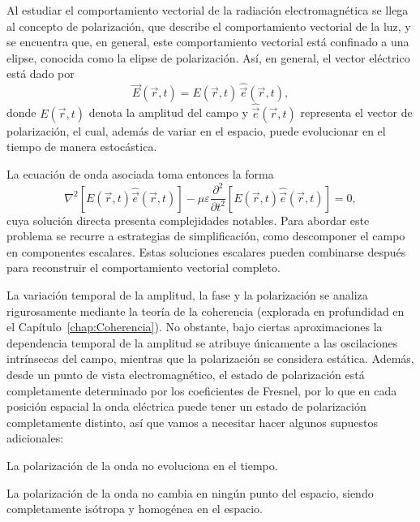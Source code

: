 	Al estudiar el comportamiento vectorial de la radiación electromagnética se llega al concepto de polarización, que describe el comportamiento vectorial de la luz, y se encuentra que, en general, este comportamiento vectorial está confinado a una elipse, conocida como la elipse de polarización. Así, en general, el vector eléctrico está dado por
	\begin{equation}
	\vec{E}(\vec{r},t) = E(\vec{r},t) \, \hat{\vec{e}}(\vec{r},t),
	\end{equation}
	donde $E(\vec{r},t)$ denota la amplitud del campo y $\hat{\vec{e}}(\vec{r},t)$ representa el vector de polarización, el cual, además de variar en el espacio, puede evolucionar en el tiempo de manera estocástica.

	La ecuación de onda asociada toma entonces la forma
	\begin{equation}
	\nabla^2 \left[ E(\vec{r},t)\hat{\vec{e}}(\vec{r},t) \right] - \mu\varepsilon \frac{\partial^2}{\partial t^2} \left[ E(\vec{r},t)\hat{\vec{e}}(\vec{r},t) \right] = 0,
	\end{equation}
	cuya solución directa presenta complejidades notables. Para abordar este problema se recurre a estrategias de simplificación, como descomponer el campo en componentes escalares. Estas soluciones escalares pueden combinarse después para reconstruir el comportamiento vectorial completo.

	La variación temporal de la amplitud, la fase y la polarización se analiza rigurosamente mediante la teoría de la coherencia (explorada en profundidad en el Capítulo~\ref{chap:Coherencia}). No obstante, bajo ciertas aproximaciones la dependencia temporal de la amplitud se atribuye únicamente a las oscilaciones intrínsecas del campo, mientras que la polarización se considera estática. Además, desde un punto de vista electromagnético, el estado de polarización está completamente determinado por los coeficientes de Fresnel, por lo que en cada posición espacial la onda eléctrica puede tener un estado de polarización completamente distinto, así que vamos a necesitar hacer algunos supuestos adicionales:

	\begin{Assumption}
		La polarización de la onda no evoluciona en el tiempo.
	\end{Assumption}
	\begin{Assumption}
		La polarización de la onda no cambia en ningún punto del espacio, siendo completamente isótropa y homogénea en el espacio.
	\end{Assumption}

